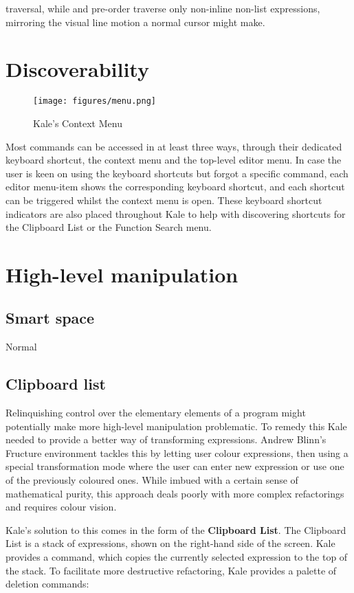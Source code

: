 \documentclass[11pt]{report}
\begin{document}
traversal, while \ak{^} and 
pre-order traverse only non-inline non-list expressions, mirroring the visual
line motion a normal cursor might make.

\section{Discoverability}
\setlength\intextsep{0pt}
\begin{wrapfigure}{R}{0pt}
\texttt{[image: figures/menu.png]}
\caption{Kale's Context Menu}
\end{wrapfigure}
Most commands can be accessed in at least three ways, through their dedicated
keyboard shortcut, the context menu and the top-level editor menu. In case the
user is keen on using the keyboard shortcuts but forgot a specific command,
each editor menu-item shows the corresponding keyboard shortcut, and each
shortcut can be triggered whilst the context menu is open. These keyboard
shortcut indicators are also placed throughout Kale to help with discovering
shortcuts for the Clipboard List or the Function Search menu.

\section{High-level manipulation}
\subsection{Smart space}
Normal 

\subsection{Clipboard list}
Relinquishing control over the elementary elements of a program might
potentially make more high-level manipulation problematic. To remedy this
Kale needed to provide a better way of transforming expressions. Andrew Blinn's
Fructure \cite{Fructure} environment tackles this by letting user colour
expressions, then
using a special transformation mode where the user can enter new expression or
use one of the previously coloured ones. While imbued with a certain sense of
mathematical purity, this approach deals poorly with more complex refactorings
and requires colour vision.

Kale's solution to this comes in the form of the \textbf{Clipboard List}. The
Clipboard List is a stack of expressions, shown on the right-hand side of the
screen. Kale provides a   command, which copies the currently
selected expression to the top of the stack. To facilitate more destructive
refactoring, Kale provides a palette of deletion commands:
\end{document}
